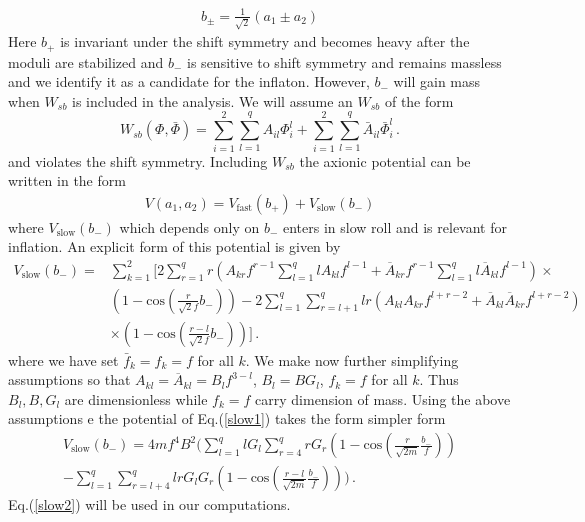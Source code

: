 \documentclass[12pt]{article}
\def\non{\nonumber\\}
\begin{document}
 \begin{align}
 b_{\pm}= \frac{1}{\sqrt 2} (a_1\pm a_2) 
 \label{b+b-}
 \end{align}
Here $b_+$ is invariant under the shift symmetry and becomes heavy after the moduli are stabilized and $b_-$ is sensitive 
to shift symmetry and remains massless and we identify it as a candidate for the inflaton. However, $b_-$ will gain mass
when $W_{sb}$ is included in the analysis.  We will assume an $W_{sb}$ of the form
\begin{equation}
W_{sb} \left( \Phi,\bar \Phi \right) =
\sum_{i= 1}^{2} \sum_{l = 1}^{q} {A}_{i  l} {\Phi}_{i}^{l} + \sum_{i = 1}^{2} \sum_{l = 1}^{q} {\bar{A}}_{i  l} {\bar{\Phi}}_{i}^{l}\,.
\label{wsn1}
\end{equation}
and violates the shift symmetry. Including $W_{sb}$ the axionic potential can be written in the form 
\begin{align}
V(a_1,a_2) = V_{\text{fast}}(b_+) + V_{\text{slow}}(b_-)
\end{align}
where $V_{\text{slow}}(b_-)$ which depends only on $b_-$ enters in slow roll and is relevant for inflation.
An explicit form of this potential is given by 
\begin{align}
{V}_{\text{slow}} (b_-) =& \sum_{k = 1}^{2} \Big[ 2 \sum_{r = 1}^{q} r  \left( {A}_{k  r} {f}^{r - 1}  \sum_{l = 1}^{q} l  {A}_{k  l} {f}^{l - 1} + {\overline{A}}_{k  r}  {{f}}^{r - 1} \sum_{l = 1}^{q} l  \overline{{A}}_{k  l} {{f}}^{l - 1} \right) \times \non
& \left( 1 - \text{cos} \left( \frac{r}{ \sqrt 2 f}
{b}_{-}\right) \right)
- 2 \sum_{l = 1}^{q} \sum_{r = l + 1}^{q} l  r  \left( {A}_{k  l} {A}_{k  r} {f}^{l + r - 2} + {\overline{A}}_{k  l} {\overline{A}}_{k  r} {{f}}^{l + r - 2} \right)\non
&\times \left( 1 - \text{cos} \left( \frac{r - l}{\sqrt 2 f } {b}_{-}\right) \right) \Big]\,.
\label{slow1}
\end{align}
where we have set $\bar f_k=f_k=f$ for all $k$.
 We make now further  simplifying assumptions so that
 ${A}_{k  l} = {\overline{A}}_{k  l} = {B}_{l} {f}^{3 - l}$, ${B}_{l} = B  {G}_{l}$,  ${f}_{k} = f$  for all $k$. Thus $B_l, B, G_l$ are dimensionless while $f_k=f$ carry dimension of mass. Using the above assumptions 
e the potential of Eq.(\ref{slow1}) takes the form simpler form 
\begin{equation}
\begin{aligned}
{V}_{\text{slow}} \left( {b}_{-} \right) = 
4 m  {f}^{4} {B}^{2}  \Big( \sum_{l = 1}^{q} l  {G}_{l}  \sum_{r = 4}^{q} r  {G}_{r}  \left( 1 - \text{cos} \left( \frac{r}{\sqrt{2 m}} \frac{{b}_{-}}{f} \right) \right) \\
- \sum_{l = 1}^{q} \sum_{r = l + 4}^{q} l  r  {G}_{l} {G}_{r}  \left( 1 - \text{cos} \left( \frac{r - l}{\sqrt{2 m}} \frac{{b}_{-}}{f} \right) \right) \Big)\,.
\label{slow2}
\end{aligned}
\end{equation}
Eq.(\ref{slow2}) will be used  in our computations.\\
\end{document}
